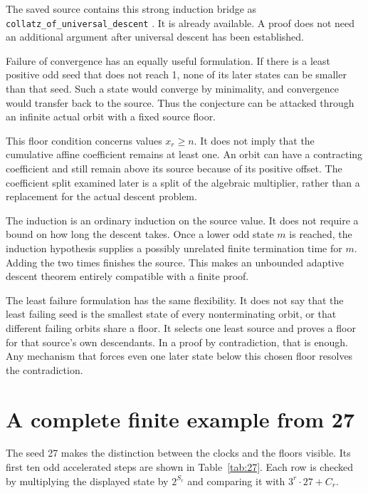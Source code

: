The saved source contains this strong induction bridge as \texttt{collatz\_\allowbreak of\_\allowbreak universal\_\allowbreak descent} \cite{projectcollatzcore}. It is already available. A proof does not need an additional argument after universal descent has been established.

Failure of convergence has an equally useful formulation. If there is a least positive odd seed that does not reach 1, none of its later states can be smaller than that seed. Such a state would converge by minimality, and convergence would transfer back to the source. Thus the conjecture can be attacked through an infinite actual orbit with a fixed source floor.

This floor condition concerns values $x_r\ge n$. It does not imply that the cumulative affine coefficient remains at least one. An orbit can have a contracting coefficient and still remain above its source because of its positive offset. The coefficient split examined later is a split of the algebraic multiplier, rather than a replacement for the actual descent problem.

The induction is an ordinary induction on the source value. It does not require a bound on how long the descent takes. Once a lower odd state $m$ is reached, the induction hypothesis supplies a possibly unrelated finite termination time for $m$. Adding the two times finishes the source. This makes an unbounded adaptive descent theorem entirely compatible with a finite proof.

The least failure formulation has the same flexibility. It does not say that the least failing seed is the smallest state of every nonterminating orbit, or that different failing orbits share a floor. It selects one least source and proves a floor for that source's own descendants. In a proof by contradiction, that is enough. Any mechanism that forces even one later state below this chosen floor resolves the contradiction.

\section{A complete finite example from 27}
The seed 27 makes the distinction between the clocks and the floors visible. Its first ten odd accelerated steps are shown in Table~\ref{tab:27}. Each row is checked by multiplying the displayed state by $2^{S_r}$ and comparing it with $3^r\cdot27+C_r$.

